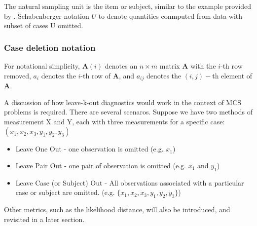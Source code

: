 \documentclass[12pt, a4paper]{report}
\theoremstyle{plain}
\theoremstyle{definition}
\theoremstyle{remark}
\begin{document}
	The natural sampling unit is the item or subject, similar to the example provided by \citet{schabenberger}. 
	Schabenberger notation $U$ to denote quantities conmputed from data with subset of cases U omitted.
	

\subsubsection{Case deletion notation} 
		
		For notational simplicity, $\boldsymbol{A}(i)$ denotes an $n \times m$ matrix $\boldsymbol{A}$ with the $i$-th row
		removed, $a_i$ denotes the $i$-th row of $\boldsymbol{A}$, and $a_{ij}$ denotes the $(i, j)-$th element of $\boldsymbol{A}$.
		
A discussion of how leave-k-out diagnostics would work in the context of MCS problems is required. There are several scenaros. Suppose we have two methods of measurement X and Y, each with three measurements for a specific case: $(x_1,x_2,x_3,y_1,y_2,y_3)$
	
	\begin{itemize}
		\item Leave One Out - one observation is omitted (e.g. $x_1$)
		\item Leave Pair Out - one pair of observation  is omitted (e.g. $x_1$ and $y_1$)
		\item Leave Case (or Subject) Out - All observations associated with a particular case or subject are omitted. (e.g. $\{x_1,x_2,x_3,y_1,y_2,y_3\}$)
	\end{itemize}
	Other metrics, such as the likelihood distance, will also be introduced, and revisited in a later section.
	
	
\end{document}
